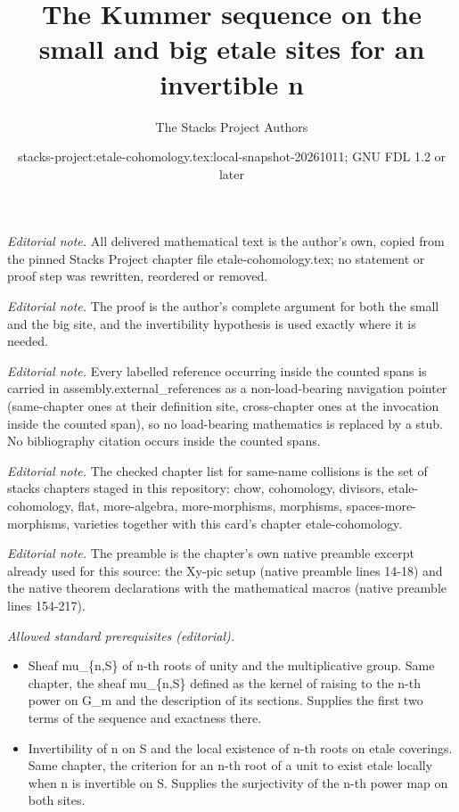 \documentclass[10pt,a4paper]{amsart}
\title{The Kummer sequence on the small and big etale sites for an invertible n}
\author{The Stacks Project Authors}
\date{stacks-project:etale-cohomology.tex:local-snapshot-20261011; GNU FDL 1.2 or later}
\theoremstyle{plain}
\theoremstyle{definition}
\theoremstyle{remark}
\numberwithin{equation}{subsection}
\begin{document}
\maketitle
\noindent\textit{Editorial note.} All delivered mathematical text is the author's own, copied from the pinned Stacks Project chapter file etale-cohomology.tex; no statement or proof step was rewritten, reordered or removed.\par\medskip
\noindent\textit{Editorial note.} The proof is the author's complete argument for both the small and the big site, and the invertibility hypothesis is used exactly where it is needed.\par\medskip
\noindent\textit{Editorial note.} Every labelled reference occurring inside the counted spans is carried in assembly.external\_references as a non-load-bearing navigation pointer (same-chapter ones at their definition site, cross-chapter ones at the invocation inside the counted span), so no load-bearing mathematics is replaced by a stub. No bibliography citation occurs inside the counted spans.\par\medskip
\noindent\textit{Editorial note.} The checked chapter list for same-name collisions is the set of stacks chapters staged in this repository: chow, cohomology, divisors, etale-cohomology, flat, more-algebra, more-morphisms, morphisms, spaces-more-morphisms, varieties together with this card's chapter etale-cohomology.\par\medskip
\noindent\textit{Editorial note.} The preamble is the chapter's own native preamble excerpt already used for this source: the Xy-pic setup (native preamble lines 14-18) and the native theorem declarations with the mathematical macros (native preamble lines 154-217).\par\medskip
\noindent\textit{Allowed standard prerequisites (editorial).}\begin{itemize}
\item Sheaf mu\_\{n,S\} of n-th roots of unity and the multiplicative group. Same chapter, the sheaf mu\_\{n,S\} defined as the kernel of raising to the n-th power on G\_m and the description of its sections. Supplies the first two terms of the sequence and exactness there.
\item Invertibility of n on S and the local existence of n-th roots on etale coverings. Same chapter, the criterion for an n-th root of a unit to exist etale locally when n is invertible on S. Supplies the surjectivity of the n-th power map on both sites.
\end{itemize}\medskip
\end{document}
